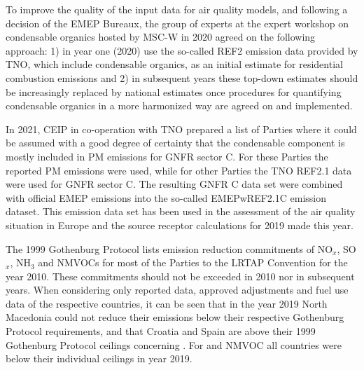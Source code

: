 To improve the quality of the input data for air quality models, and following a decision of the EMEP Bureaux, the group of experts at the expert workshop on condensable organics hosted by MSC-W in 2020 agreed on the following approach: 1) in year one (2020) use the so-called REF2 emission data provided by TNO, which include condensable organics, as an initial estimate for residential combustion emissions and 2) in subsequent years these top-down estimates should be increasingly replaced by national estimates once procedures for quantifying condensable organics in a more harmonized way are agreed on and implemented. 

In 2021, CEIP in co-operation with TNO prepared a list of Parties where it could be assumed with a good degree of certainty that the condensable component is mostly included in PM emissions for GNFR sector C. For these Parties the reported PM emissions were used, while for other Parties the TNO REF2.1 data were used for GNFR sector C. The resulting GNFR C data set were combined with official EMEP emissions into the so-called EMEPwREF2.1C emission dataset. This emission data set has been used in the assessment of the air quality situation in Europe and the source receptor calculations for 2019 made this year. 

The 1999 Gothenburg Protocol lists emission reduction commitments of NO$_x$, SO$_x$, NH$_3$ and NMVOCs for most of the Parties to the LRTAP Convention for the year 2010. These commitments should not be exceeded in 2010 nor in subsequent years. When considering only reported data, approved adjustments and fuel use data of the respective countries, it can be seen that in the year 2019 North Macedonia could not reduce their \sox emissions below their respective Gothenburg Protocol requirements, and that Croatia and Spain are above their 1999 Gothenburg Protocol ceilings concerning \nhiii. For \nox and NMVOC all countries were below their individual ceilings in year 2019.



